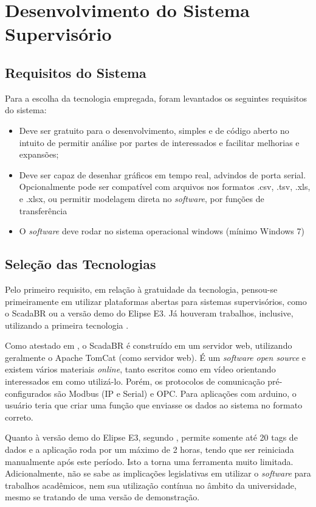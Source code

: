 \chapter{Desenvolvimento do Sistema Supervisório}

\section{Requisitos do Sistema}

Para a escolha da tecnologia empregada, foram levantados os seguintes requisitos do sistema:
\begin{itemize}
	\item Deve ser gratuito para o desenvolvimento, simples e de código aberto no intuito de permitir análise por partes de interessados e facilitar melhorias e expansões;
	\item Deve ser capaz de desenhar gráficos em tempo real, advindos de porta serial. Opcionalmente pode ser compatível com arquivos nos formatos .csv, .tsv, .xls, e .xlsx, ou permitir modelagem direta no \textit{software}, por funções de transferência
	\item O \textit{software} deve rodar no sistema operacional windows (mínimo Windows 7)
\end{itemize}

\section{Seleção das Tecnologias}

Pelo primeiro requisito, em relação à gratuidade da tecnologia, pensou-se primeiramente em utilizar plataformas abertas para sistemas supervisórios, como o ScadaBR ou a versão demo do Elipse E3. Já houveram trabalhos, inclusive, utilizando a primeira tecnologia \cite{Moraes2016}.

Como atestado em , o ScadaBR é construído em um servidor web, utilizando geralmente o Apache TomCat (como servidor web). É um \emph{software} \emph{open source} e existem vários materiais \emph{online}, tanto escritos como em vídeo orientando interessados em como utilizá-lo. Porém, os protocolos de comunicação pré-configurados são Modbus (IP e Serial) e OPC. Para aplicações com arduino, o usuário teria que criar uma função que enviasse os dados ao sistema no formato correto.

Quanto à versão demo do Elipse E3, segundo , permite somente até 20 tags de dados e a aplicação roda por um máximo de 2 horas, tendo que ser reiniciada manualmente após este período. Isto a torna uma ferramenta muito limitada. Adicionalmente, não se sabe as implicações legislativas em utilizar o \emph{software} para trabalhos acadêmicos, nem sua utilização contínua no âmbito da universidade, mesmo se tratando de uma versão de demonstração.

